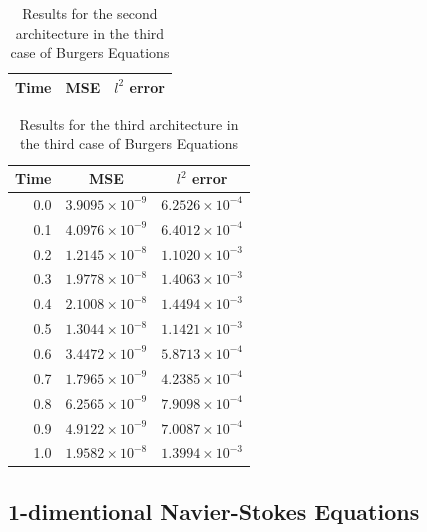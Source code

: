 \documentclass[12pt,letterpaper]{article}
\begin{document}
    \begin{table}[H]
      \begin{center}
      \begin{tabular}{ r | c  c }
      \textbf{Time} & \textbf{MSE} & \textbf{$l^2$ error} \\ \hline

      \end{tabular}
      \caption{Results for the second architecture in the third case of Burgers Equations}
      \label{tab:B32}
      \end{center}
  
      \end{table}
      \begin{table}[H]
        \begin{center}
        \begin{tabular}{ r | c  c }
        \textbf{Time} & \textbf{MSE} & \textbf{$l^2$ error} \\ \hline
        0.0 & $ 3.9095\times 10^{-9}$ & $ 6.2526\times 10^{-4} $ \\
        0.1 & $ 4.0976\times 10^{-9}$ & $ 6.4012\times 10^{-4} $ \\
        0.2 & $ 1.2145\times 10^{-8}$ & $ 1.1020\times 10^{-3} $ \\
        0.3 & $ 1.9778\times 10^{-8}$ & $ 1.4063\times 10^{-3} $ \\
        0.4 & $ 2.1008\times 10^{-8}$ & $ 1.4494\times 10^{-3} $ \\
        0.5 & $ 1.3044\times 10^{-8}$ & $ 1.1421\times 10^{-3} $ \\
        0.6 & $ 3.4472\times 10^{-9}$ & $ 5.8713\times 10^{-4} $ \\
        0.7 & $ 1.7965\times 10^{-9}$ & $ 4.2385\times 10^{-4} $ \\
        0.8 & $ 6.2565\times 10^{-9}$ & $ 7.9098\times 10^{-4} $ \\
        0.9 & $ 4.9122\times 10^{-9}$ & $ 7.0087\times 10^{-4} $ \\
        1.0 & $ 1.9582\times 10^{-8}$ & $ 1.3994\times 10^{-3} $ \\
        \end{tabular}
        \caption{Results for the third architecture in the third case of Burgers Equations}
        \label{tab:B33}
        \end{center}
        \end{table}  

\subsection{1-dimentional Navier-Stokes Equations}
\end{document}
